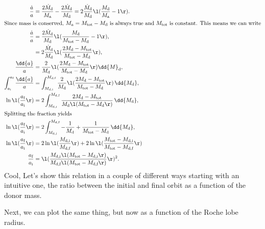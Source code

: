 \documentclass[a4paper,10pt]{article}
\begin{document}
\begin{align*}
    \frac{\dot{a}}{a} &= \frac{2 \dot{M}_\text{d}}{M_\text{a}} - \frac{2 \dot{M}_\text{d}}{M_\text{d}} = 2 \frac{\dot{M}_\text{d} }{M_\text{d}}\l(\frac{M_\text{d}}{M_\text{a}} - 1\r).\\
    \intertext{Since mass is conserved, \(M_{a} = M_\text{tot} - M_\text{d} \) is always true and \(M_\text{tot}\) is constant. This means we can write}
    \frac{\dot{a}}{a} &= \frac{2\dot{M}_\text{d} }{M_\text{d}}\l(\frac{M_\text{d}}{M_\text{tot} - M_\text{d}} - 1\r),\\
    &= 2 \frac{\dot{M}_\text{d} }{M_\text{d}}\l(\frac{2M_\text{d} - M_\text{tot}}{M_\text{tot} - M_\text{d}}\r),\\
    \frac{\dd{a}}{a} &= \frac{2}{M_\text{d}} \l(\frac{2M_\text{d} - M_\text{tot}}{M_\text{tot} - M_\text{d}} \r) \dd{M}_\text{d},\\
    \int_{a_\text{i}}^{a_\text{f}} \frac{\dd{a}}{a} &= \int_{M_\text{d,i}}^{M_\text{d,f}} \frac{2}{M_\text{d}} \l(\frac{2M_\text{d} - M_\text{tot}}{M_\text{tot} - M_\text{d}} \r)  \,\dd{M_\text{d}},\\
    \ln \l(\frac{a_\text{f}}{a_\text{i}}\r)  &= 2\int_{M_\text{d,i}}^{M_\text{d,f}} \frac{2M_\text{d} - M_\text{tot}}{M_\text{d} \l(M_\text{tot} - M_\text{d}\r) } \,\dd{M_\text{d}},\\
    \intertext{Splitting the fraction yields}
    \ln \l(\frac{a_\text{f}}{a_\text{i}}\r)  &= 2\int_{M_\text{d,i}}^{M_\text{d,f}}-\frac{1}{M_\text{d}} + \frac{1}{M_\text{tot} - M_\text{d}} \,\dd{M_\text{d}},\\
    \ln \l(\frac{a_\text{f}}{a_\text{i}}\r)  &= 2 \ln \l(\frac{M_\text{d,i}}{M_\text{d,f}}\r) + 2\ln \l(\frac{M_\text{tot} - M_\text{d,i}}{M_\text{tot}-M_\text{d,f}}\r)\\
    \frac{a_\text{f}}{a_\text{i}} &= \l(\frac{M_\text{d,i}\l(M_\text{tot} - M_\text{d,i}\r) }{M_\text{d,f}\l(M_\text{tot} - M_\text{d,f}\r) }\r)^{2}.
\end{align*}
Cool, Let's show this relation in a couple of different ways starting with an intuitive one, the ratio between the initial and final orbit as a function of the donor mass.
\begin{figure}[ht]
    \centering
\end{figure}

Next, we can plot the same thing, but now as a function of the Roche lobe radius.
\end{document}
